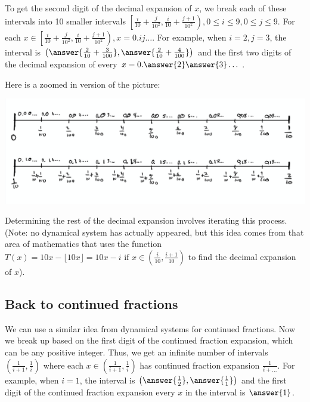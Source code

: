 \documentclass{ximera}
\begin{document}
To get the second digit of the decimal expansion of $x$, we break each of these intervals into 10 smaller intervals $\left[\frac{i}{10}+\frac{j}{10^2},\frac{i}{10}+\frac{j+1}{10^2}\right), 0\leq i\leq 9,0\leq j\leq 9$. For each $x\in\left[\frac{i}{10}+\frac{j}{10^2},\frac{i}{10}+\frac{j+1}{10^2}\right), x=0.ij\dots.$ For example, when $i=2,j=3$, the interval is $\left(\answer{\frac{2}{10}+\frac{3}{100}},\answer{\frac{2}{10}+\frac{4}{100}}\right)$ and the first two digits of the decimal expansion of every $x=0.\answer{2}\answer{3}\dots$.

Here is a zoomed in version of the picture:
\begin{image}
 \includegraphics[width=\textwidth]{zoomeddecimal}
\end{image}

Determining the rest of the decimal expansion involves iterating this process. (Note: no dynamical system has actually appeared, but this idea comes from that area of mathematics that uses the function $T(x)=10x-\lfloor 10x\rfloor=10x-i \textrm{ if }x\in\left(\frac{i}{10},\frac{i+1}{10}\right)$ to find the decimal expansion of $x$).

\subsection{Back to continued fractions}
We can use a similar idea from dynamical systems for continued fractions. Now we break up based on the first digit of the continued fraction expansion, which can be any positive integer. Thus, we get an infinite number of intervals $\left(\frac{1}{i+1},\frac{1}{i}\right)$ where each $x\in\left(\frac{1}{i+1},\frac{1}{i}\right)$ has continued fraction expansion $\frac{1}{i+\dots}$.  For example, when $i=1$, the interval is $\left(\answer{\frac{1}{2}},\answer{\frac{1}{1}}\right)$ and the first digit of the continued fraction expansion every $x$ in the interval is $\answer{1}$. 
\end{document}
